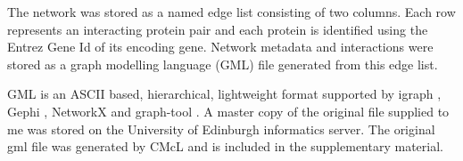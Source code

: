 

The network was stored as a named edge list consisting of two columns. Each row represents an interacting protein pair and each protein is identified using the Entrez Gene Id of its encoding gene. Network metadata and interactions were stored as a graph modelling language (GML) file generated from this edge list. \cite{himsolt1997gml}




GML is an ASCII based, hierarchical, lightweight format supported by igraph \cite{csardi2006igraph}, Gephi \cite{bastian2009gephi} , NetworkX \cite{hagberg2008exploring} and graph-tool \cite{peixoto_graph-tool_2014}.  A master copy of the original file supplied to me was stored on the University of Edinburgh informatics server. The original gml file was generated by CMcL and is included in the supplementary material.




